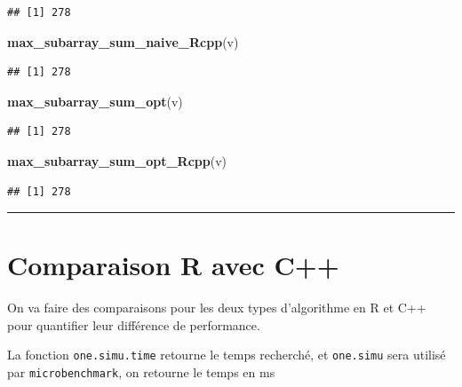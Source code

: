 \documentclass[
]{article}
\newenvironment{Shaded}{\begin{snugshade}}{\end{snugshade}}
\newcommand{\FunctionTok}[1]{\textcolor[rgb]{0.13,0.29,0.53}{\textbf{#1}}}
\newcommand{\NormalTok}[1]{#1}
\begin{document}
\begin{verbatim}
## [1] 278
\end{verbatim}

\begin{Shaded}
\begin{Highlighting}[]
\FunctionTok{max\_subarray\_sum\_naive\_Rcpp}\NormalTok{(v)}
\end{Highlighting}
\end{Shaded}

\begin{verbatim}
## [1] 278
\end{verbatim}

\begin{Shaded}
\begin{Highlighting}[]
\FunctionTok{max\_subarray\_sum\_opt}\NormalTok{(v)}
\end{Highlighting}
\end{Shaded}

\begin{verbatim}
## [1] 278
\end{verbatim}

\begin{Shaded}
\begin{Highlighting}[]
\FunctionTok{max\_subarray\_sum\_opt\_Rcpp}\NormalTok{(v)}
\end{Highlighting}
\end{Shaded}

\begin{verbatim}
## [1] 278
\end{verbatim}

\begin{center}\rule{0.5\linewidth}{0.5pt}\end{center}

\section{Comparaison R avec C++}\label{comparaison-r-avec-c}

On va faire des comparaisons pour les deux types d'algorithme en R et
C++ pour quantifier leur différence de performance.

La fonction \texttt{one.simu.time} retourne le temps recherché, et
\texttt{one.simu} sera utilisé par \texttt{microbenchmark}, on retourne
le temps en ms
\end{document}
